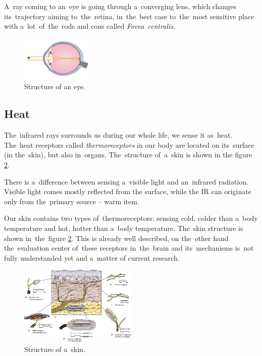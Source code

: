 A~ray coming to an~eye is going through a~converging lens, which changes its~trajectory aiming to~the~retina,
in~the~best case to~the~most sensitive place with a~lot~of~the~rods and cons called {\it Fovea~centralis}.
\cite{LightEyeVision}

\begin{figure}[h!]
\begin{center}
\includegraphics[width=0.3\textwidth]{obrazky-figures/eye.png}
\caption{Structure of an eye. \cite{Eye}\label{fig:eye}}
\end{center}    
\end{figure}


\subsection*{Heat}
The~infrared rays surrounds us during our whole life, we sense it as~heat. The~heat receptors called
{\it thermoreceptors} in our body are located on its~surface (in the~skin), but also in~organs.
The~structure of~a~skin is shown in the figure \ref{fig:skin}. 

There is a~difference between sensing a~visible light and an~infrared radiation. Visible light comes
mostly reflected from the surface, while the IR can originate only from the~primary source -- warm item.

Our skin contains two types of~thermoreceptors: sensing cold, colder than a~body temperature and
hot, hotter than a~body temperature. The~skin structure is shown in~the~figure \ref{fig:skin}.
This is already well described, on the~other hand the~evaluation center of~these receptors in~the~brain
and its~mechanisms is~not fully understanded yet and a~matter of current research. \cite{BodilySenses}

\begin{figure}[h!]
\begin{center}
\includegraphics[width=0.5\textwidth]{obrazky-figures/skin.jpg}
\caption{Structure of a~skin. \cite{SkinStructure}\label{fig:skin}}
\end{center}    
\end{figure}

